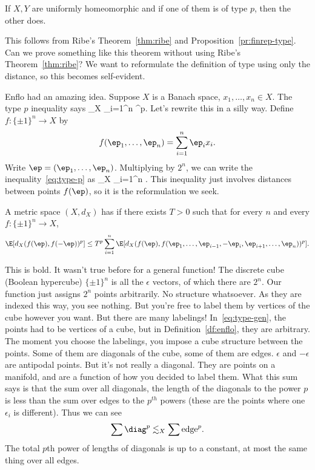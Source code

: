 \begin{cor}
If $X,Y$ are uniformly homeomorphic and if one of them is of type $p$, then the other does. 
\end{cor}
This follows from Ribe's Theorem~\ref{thm:ribe} and Proposition~\ref{pr:finrep-type}. Can we prove something like this theorem without using Ribe's Theorem~\ref{thm:ribe}?
We want to reformulate the definition of type using only the distance, so this becomes self-evident.

Enflo had an amazing idea. 
Suppose $X$ is a Banach space, $x_1,\ldots, x_n\in X$. The type $p$ inequality  says 
\E{} \lesssim_X \sum_{i=1}^n ^p.
\eeq
Let's rewrite this in a silly way. Define $f:\{\pm 1\}^n\to X$ by
\[
f(\ep_1,\ldots, \ep_n)=\sum_{i=1}^n \ep_i x_i.
\]
Write $\ep=(\ep_1,\ldots, \ep_n)$. Multiplying by $2^n$, we can write the inequality~\eqref{eq:type-p} as
\E{}\lesssim_X
\sum_{i=1}^n \E{}.
\eeq
This inequality just involves distances between points $f(\ep)$, so it is the reformulation we seek.

\begin{df}
A metric space $(X,d_X)$ has  if there exists $T>0$ such that for every $n$ and every $f:\{\pm 1\}^n\to X$,
\[
\E[d_X(f(\ep), f(-\ep))^p]\le T^p \sum_{i=1}^n \E[ d_X(f(\ep), f(\ep_1,\ldots, \ep_{i-1}, -\ep_i, \ep_{i+1},\ldots, \ep_n))^p].
\]
\end{df}

This is bold. It wasn't true before for a general function! The discrete cube (Boolean hypercube) $\{\pm 1\}^n$ is all the $\epsilon$ vectors, of which there are $2^n$. Our function just assigns $2^n$ points arbitrarily. No structure whatsoever. As they are indexed this way, you see nothing. But you're free to label them by vertices of the cube however you want. But there are many labelings! In~\eqref{eq:type-gen}, the points had to be vertices of a cube, but in Definition~\ref{df:enflo}, they are arbitrary. The moment you choose the labelings, you impose a cube structure between the points. Some of them are diagonals of the cube, some of them are edges. $\epsilon$ and $-\epsilon$ are antipodal points. But it's not really a diagonal. They are points on a manifold, and are a function of how you decided to label them. What this sum says is that the sum over all diagonals, the length of the diagonals to the power $p$ is less than the sum over edges to the $p^{th}$ powers (these are the points where one $\epsilon_i$ is different). Thus we can see 
\[
\sum \diag^p\lesssim_X\sum \text{edge}^p.
\]
The total $p$th power of lengths of diagonals is up to a constant, at most the same thing over all edges.

